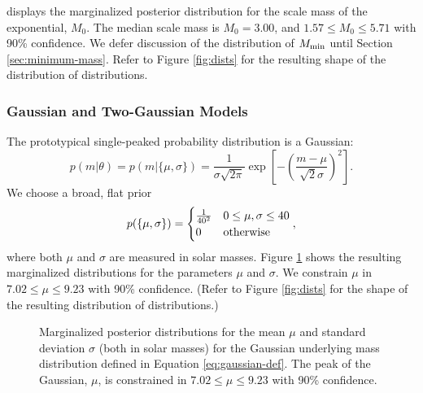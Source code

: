 \documentclass[preprint]{aastex}
\newcommand{\Mmin}{M_{\textnormal{min}}}
\begin{document}
 displays the marginalized posterior
distribution for the scale mass of the exponential, $M_0$.  The median
scale mass is $M_0 = 3.00$, and $1.57 \leq M_0 \leq 5.71$ with 90\%
confidence.  We defer discussion of the distribution of $\Mmin$ until
Section \ref{sec:minimum-mass}.  Refer to Figure \ref{fig:dists}
for the resulting shape of the distribution of distributions.


\subsubsection{Gaussian and Two-Gaussian Models}
\label{subsubsec:gaussian}

The prototypical single-peaked probability distribution is a
Gaussian:
\begin{equation}
  p(m|\theta) = p(m|\{\mu, \sigma\}) = \frac{1}{\sigma \sqrt{2\pi}}
  \exp\left[ - \left(\frac{m - \mu}{\sqrt{2} \sigma} \right)^2 \right].
\end{equation}
We choose a broad, flat prior 
\begin{equation}
  \label{eq:gaussian-def}
  p(\{\mu,\sigma\}) = 
  \begin{cases}
    \frac{1}{40^2} & 0 \leq \mu, \sigma \leq 40 \\
    0 & \textnormal{otherwise}
  \end{cases},
\end{equation}
where both $\mu$ and $\sigma$ are measured in solar masses.  Figure
\ref{fig:gaussian} shows the resulting marginalized distributions for
the parameters $\mu$ and $\sigma$.  We constrain $\mu$ in $7.02 \leq
\mu \leq 9.23$ with 90\% confidence.  (Refer to Figure \ref{fig:dists}
for the shape of the resulting distribution of distributions.)

\begin{figure}
  \begin{center}
  \end{center}
  \caption{\label{fig:gaussian} Marginalized posterior distributions
    for the mean $\mu$ and standard deviation $\sigma$ (both in solar
    masses) for the Gaussian underlying mass distribution defined in
    Equation \eqref{eq:gaussian-def}.  The peak of the Gaussian,
    $\mu$, is constrained in $7.02 \leq \mu \leq 9.23$ with 90\%
    confidence.}
\end{figure}
\end{document}
